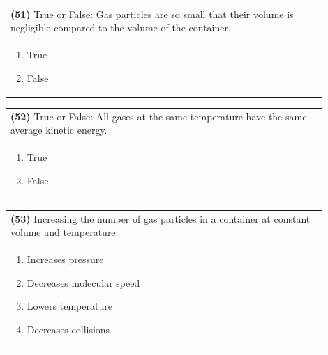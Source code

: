 \documentclass{article}
\begin{document}
{{\vspace{0.2cm}
\noindent\begin{tabular}{|p{0.9\linewidth}|}
\hline
\textbf{(51)} True or False: Gas particles are so small that their volume is negligible compared to the volume of the container.\\[0.2cm]

\begin{minipage}[t]{0.85\linewidth}
\begin{enumerate}[label=\alph*.]
\item True
\item False
\end{enumerate}
\end{minipage}\\[0.2cm]
\hline
\end{tabular}

\vspace{0.2cm}
\noindent\begin{tabular}{|p{0.9\linewidth}|}
\hline
\textbf{(52)} True or False: All gases at the same temperature have the same average kinetic energy.\\[0.2cm]

\begin{minipage}[t]{0.85\linewidth}
\begin{enumerate}[label=\alph*.]
\item True
\item False
\end{enumerate}
\end{minipage}\\[0.2cm]
\hline
\end{tabular}

\newpage

\noindent\begin{tabular}{|p{0.9\linewidth}|}
\hline
\textbf{(53)} Increasing the number of gas particles in a container at constant volume and temperature:\\[0.2cm]

\begin{minipage}[t]{0.85\linewidth}
\begin{enumerate}[label=\alph*.]
\item Increases pressure
\item Decreases molecular speed
\item Lowers temperature
\item Decreases collisions
\end{enumerate}
\end{minipage}\\[0.2cm]
\hline
\end{tabular}

}}
\end{document}
